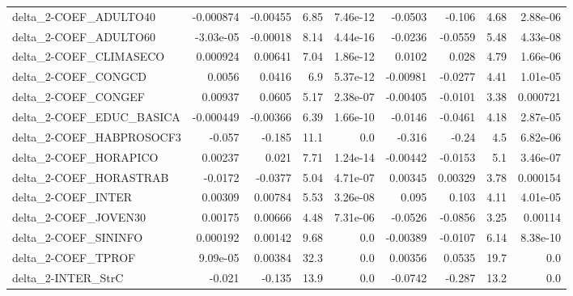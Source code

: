 \begin{tabular}{lrrrrrrrr}
delta\_2-COEF\_ADULTO40                &   -0.000874 &     -0.00455 &    6.85 & 7.46e-12 &    -0.0503 &      -0.106 &         4.68 &      2.88e-06 \\
delta\_2-COEF\_ADULTO60                &   -3.03e-05 &     -0.00018 &    8.14 & 4.44e-16 &    -0.0236 &     -0.0559 &         5.48 &      4.33e-08 \\
delta\_2-COEF\_CLIMASECO               &    0.000924 &      0.00641 &    7.04 & 1.86e-12 &     0.0102 &       0.028 &         4.79 &      1.66e-06 \\
delta\_2-COEF\_CONGCD                  &      0.0056 &       0.0416 &     6.9 & 5.37e-12 &   -0.00981 &     -0.0277 &         4.41 &      1.01e-05 \\
delta\_2-COEF\_CONGEF                  &     0.00937 &       0.0605 &    5.17 & 2.38e-07 &   -0.00405 &     -0.0101 &         3.38 &      0.000721 \\
delta\_2-COEF\_EDUC\_BASICA             &   -0.000449 &     -0.00366 &    6.39 & 1.66e-10 &    -0.0146 &     -0.0461 &         4.18 &      2.87e-05 \\
delta\_2-COEF\_HABPROSOCF3             &      -0.057 &       -0.185 &    11.1 &      0.0 &     -0.316 &       -0.24 &          4.5 &      6.82e-06 \\
delta\_2-COEF\_HORAPICO                &     0.00237 &        0.021 &    7.71 & 1.24e-14 &   -0.00442 &     -0.0153 &          5.1 &      3.46e-07 \\
delta\_2-COEF\_HORASTRAB               &     -0.0172 &      -0.0377 &    5.04 & 4.71e-07 &    0.00345 &     0.00329 &         3.78 &      0.000154 \\
delta\_2-COEF\_INTER                   &     0.00309 &      0.00784 &    5.53 & 3.26e-08 &      0.095 &       0.103 &         4.11 &      4.01e-05 \\
delta\_2-COEF\_JOVEN30                 &     0.00175 &      0.00666 &    4.48 & 7.31e-06 &    -0.0526 &     -0.0856 &         3.25 &       0.00114 \\
delta\_2-COEF\_SININFO                 &    0.000192 &      0.00142 &    9.68 &      0.0 &   -0.00389 &     -0.0107 &         6.14 &      8.38e-10 \\
delta\_2-COEF\_TPROF                   &    9.09e-05 &      0.00384 &    32.3 &      0.0 &    0.00356 &      0.0535 &         19.7 &           0.0 \\
delta\_2-INTER\_StrC                   &      -0.021 &       -0.135 &    13.9 &      0.0 &    -0.0742 &      -0.287 &         13.2 &           0.0 \\

\end{tabular}

